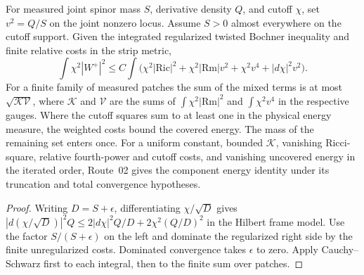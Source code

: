 \begin{proposition}
\label{prop:spin-relative-bochner}
\leanok
For measured joint spinor mass $S$, derivative density $Q$, and cutoff
$\chi$, set $v^2=Q/S$ on the joint nonzero locus. Assume $S>0$ almost
everywhere on the cutoff support. Given the integrated regularized
twisted Bochner inequality and finite relative costs in the strip metric,
\[
 \int\chi^2|W^+|^2 \le C\int
 \big(\chi^2|\mathrm{Ric}|^2+\chi^2|\mathrm{Rm}|v^2+
          \chi^2v^4+|d\chi|^2v^2\big).
\]
For a finite family of measured patches the sum of the mixed terms
is at most $\sqrt{\mathcal K\mathcal V}$, where $\mathcal K$ and
$\mathcal V$ are the sums of $\int\chi^2|\mathrm{Rm}|^2$ and
$\int\chi^2 v^4$ in the respective gauges. Where the cutoff squares
sum to at least one in the physical energy measure, the weighted costs
bound the covered energy. The mass of the remaining set enters once.
For a uniform constant, bounded $\mathcal K$, vanishing Ricci-square,
relative fourth-power and cutoff costs, and vanishing uncovered energy
in the iterated order, Route~02 gives the component energy identity
under its truncation and total convergence hypotheses.
\end{proposition}
\begin{proof}
\leanok
Writing $D=S+\epsilon$, differentiating $\chi/\sqrt D$ gives
$|d(\chi/\sqrt D)|^2Q\le 2|d\chi|^2 Q/D+2\chi^2(Q/D)^2$
in the Hilbert frame model. Use the factor $S/(S+\epsilon)$ on the left and dominate the regularized
right side by the finite unregularized costs. Dominated convergence
takes $\epsilon$ to zero. Apply Cauchy--Schwarz first to each integral,
then to the finite sum over patches.
\end{proof}

